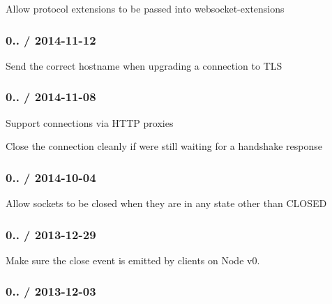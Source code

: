 \begin{DoxyItemize}
\item Allow protocol extensions to be passed into websocket-\/extensions
\end{DoxyItemize}

\subsubsection*{0.. / 2014-\/11-\/12}


\begin{DoxyItemize}
\item Send the correct hostname when upgrading a connection to T\+LS
\end{DoxyItemize}

\subsubsection*{0.. / 2014-\/11-\/08}


\begin{DoxyItemize}
\item Support connections via H\+T\+TP proxies
\item Close the connection cleanly if we\textquotesingle{}re still waiting for a handshake response
\end{DoxyItemize}

\subsubsection*{0.. / 2014-\/10-\/04}


\begin{DoxyItemize}
\item Allow sockets to be closed when they are in any state other than {\ttfamily C\+L\+O\+S\+ED}
\end{DoxyItemize}

\subsubsection*{0.. / 2013-\/12-\/29}


\begin{DoxyItemize}
\item Make sure the {\ttfamily close} event is emitted by clients on Node v0.
\end{DoxyItemize}

\subsubsection*{0.. / 2013-\/12-\/03}


